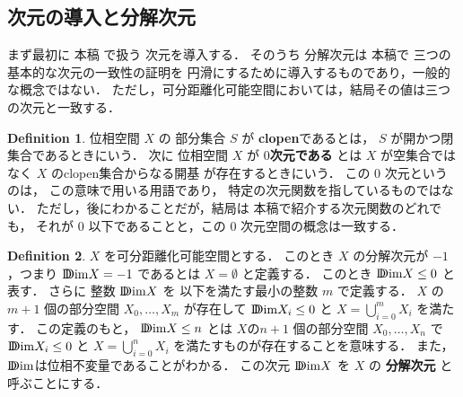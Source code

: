 \documentclass[leqno, a4paper, 12pt]{jsarticle}
\theoremstyle{plain}
\theoremstyle{definition}
\newtheorem{df}{Definition}[section]
\theoremstyle{remark}
\newcommand{\yoemph}[1]{\textbf{#1}}
\newcommand{\yoddim}{\mathrm{D\hspace{-5.5pt}Dim}}
\numberwithin{equation}{section}
\begin{document}

\subsection{次元の導入と分解次元}\label{subsec:ddim}

まず最初に
本稿
で扱う
次元を導入する．
そのうち
分解次元は
本稿で
三つの基本的な次元の一致性の証明を
円滑にするために導入するものであり，一般的な概念ではない．
ただし，可分距離化可能空間においては，結局その値は三つの次元と一致する．



\begin{df}
位相空間
$X$
の
部分集合
$S$
が
\yoemph{clopen}であるとは，
$S$
が開かつ閉集合であるときにいう．
次に
位相空間
$X$
が
\yoemph{$0$次元である}
とは
$X$
が空集合ではなく
$X$
のclopen集合からなる開基
が存在するときにいう．
この
$0$
次元というのは，
この意味で用いる用語であり，
特定の次元関数を指しているものではない．
ただし，後にわかることだが，結局は
本稿で紹介する次元関数のどれでも，
それが
$0$
以下であることと，この
$0$
次元空間の概念は一致する．
\end{df}



\begin{df}
$X$
を可分距離化可能空間とする．
このとき
$X$
の分解次元が
$-1$，つまり
$\yoddim X=-1$
であるとは
$X=\emptyset$
と定義する．
このとき
$\yoddim X\le 0$
と表す．
さらに
整数
$\yoddim X$
を
以下を満たす最小の整数
$m$
で定義する．
$X$
の
$m+1$
個の部分空間
$X_{0}, \dots, X_{m}$
が存在して
$\yoddim X_{i}\le 0$
と
$X=\bigcup_{i=0}^{m}X_{i}$
を満たす．
この定義のもと，
$\yoddim X\le n$
とは
$X$の$n+1$
個の部分空間
$X_{0}, \dots, X_{n}$
で
$\yoddim X_{i}\le 0$
と
$X=\bigcup_{i=0}^{n}X_{i}$
を満たすものが存在することを意味する．
また，
$\yoddim$は位相不変量であることがわかる．
この次元
$\yoddim X$
を
$X$
の
\yoemph{分解次元}
と呼ぶことにする．
\end{df}
\end{document}
